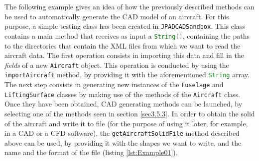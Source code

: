The following example gives an idea of how the previously described methods can be used to automatically generate the \gls{CAD} model of an aircraft. For this purpose, a simple testing class has been created in \lstinline[language=Java]!JPADCADSandbox!. This class contains a main method that receives as input a \lstinline[language=Java]!String[]!, containing the paths to the directories that contain the XML files from which we want to read the aircraft data. The first operation consists in importing this data and fill in the \emph{fields} of a new \lstinline[language=Java]!Aircraft! object. This operation is conducted by using the \lstinline[language=Java]!importAircraft! method, by providing it with the aforementioned \lstinline[language=Java]!String! array. The next step consists in generating new instances of the \lstinline[language=Java]!Fuselage! and \lstinline[language=Java]!LiftingSurface! classes by making use of the methods of the \lstinline[language=Java]!Aircraft! class. Once they have been obtained, \gls{CAD} generating methods can be launched, by selecting one of the methods seen in section \ref{sec3.5.3}. In order to obtain the solid of the aircraft and write it to file (for the purpose of using it later, for example, in a \gls{CAD} or a \gls{CFD} software), the \lstinline[language=Java]!getAircraftSolidFile! method described above can be used, by providing it with the shapes we want to write, and the name and the format of the file (listing \ref{lst:Example01}).
%
\bigskip
